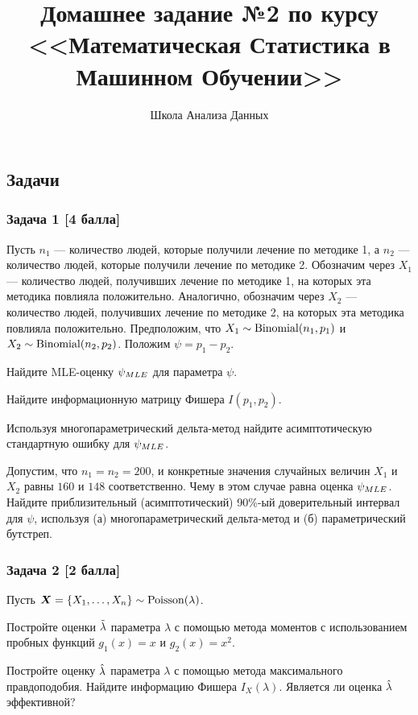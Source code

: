 \documentclass{article}
\title{Домашнее задание №2 по курсу \\ <<Математическая Статистика в Машинном Обучении>>}
\author{Школа Анализа Данных}
\date{}
\renewenvironment{itemize}[1]{\begin{compactitem}#1}{\end{compactitem}}
\begin{document}

\maketitle



\subsection*{Задачи}
\subsubsection*{Задача 1 [4 балла]}
Пусть $n_1$ --- количество людей, которые получили лечение по методике 1, а $n_2$ --- количество людей, которые получили лечение по методике 2. Обозначим через $X_1$ --- количество людей, получивших лечение по методике 1, на которых эта методика повлияла положительно. Аналогично, обозначим через $X_2$ --- количество людей, получивших лечение по методике 2, на которых эта методика повлияла положительно. Предположим, что $X_1 \sim \mathrm{Binomial}(n_1,p_1)$ и $X_2\sim \mathrm{Binomial}(n_2,p_2)$. Положим $\psi = p_1-p_2$.
\begin{itemize}
	\item[(a)] Найдите MLE-оценку $\psi_{MLE}$ для параметра $\psi$.
	\item[(b)] Найдите информационную матрицу Фишера $I(p_1,p_2)$.
	\item[(c)] Используя многопараметрический дельта-метод найдите асимптотическую стандартную ошибку для $\psi_{MLE}$.
	\item[(d)] Допустим, что $n_1=n_2=200$, и конкретные значения случайных величин $X_1$ и $X_2$ равны $160$ и $148$ соответственно. Чему в этом случае равна оценка  $\psi_{MLE}$. Найдите приблизительный (асимптотический) 90\%-ый доверительный интервал для $\psi$, используя (а) многопараметрический дельта-метод и (б) параметрический бутстреп.
\end{itemize}

\subsubsection*{Задача 2 [2 балла]}
Пусть $\boldsymbol{X} =\{X_1,\ldots,X_n\} \sim \mathrm{Poisson}(\lambda)$.
\begin{itemize}
	\item Постройте оценки $\tilde{\lambda}$ параметра $\lambda$ с помощью метода моментов с использованием пробных функций $g_1(x) = x$ и $g_2(x) = x^2$.
	\item Постройте оценку $\hat{\lambda}$ параметра $\lambda$ с помощью метода максимального правдоподобия. Найдите информацию Фишера $I_{X}(\lambda)$. Является ли оценка $\hat{\lambda}$ эффективной?
\end{itemize}
\end{document}
